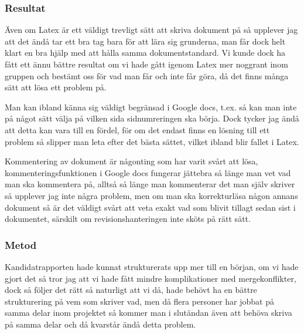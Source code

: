 

\subsubsection{Resultat}
Även om Latex är ett väldigt trevligt sätt att skriva dokument på så upplever jag att det ändå tar ett bra tag bara för att lära sig grunderna, man får dock helt klart en bra hjälp med att hålla samma dokumentstandard. Vi kunde dock ha fått ett ännu bättre resultat om vi hade gått igenom Latex mer noggrant inom gruppen och bestämt oss för vad man får och inte får göra, då det finns många sätt att lösa ett problem på.

Man kan ibland känna sig väldigt begränsad i Google docs, t.ex. så kan man inte på något sätt välja på vilken sida sidnumreringen ska börja. Dock tycker jag ändå att detta kan vara till en fördel, för om det endast finns en lösning till ett problem så slipper man leta efter det bästa sättet, vilket ibland blir fallet i Latex.



Kommentering av dokument är någonting som har varit svårt att lösa, kommenteringsfunktionen i Google docs fungerar jättebra så länge man vet vad man ska kommentera på, alltså så länge man kommenterar det man själv skriver så upplever jag inte några problem, men om man ska korrekturläsa någon annans dokument så är det väldigt svårt att veta exakt vad som blivit tillagt sedan sist i dokumentet, särskilt om revisionshanteringen inte sköts på rätt sätt.


\subsubsection{Metod}
Kandidatrapporten hade kunnat strukturerats upp mer till en början, om vi hade gjort det så tror jag att vi hade fått mindre komplikationer med mergekonflikter, dock så följer det rätt så naturligt att vi då, hade behövt ha en bättre strukturering på vem som skriver vad, men då flera personer har jobbat på samma delar inom projektet så kommer man i slutändan även att behöva skriva på samma delar och då kvarstår ändå detta problem.

